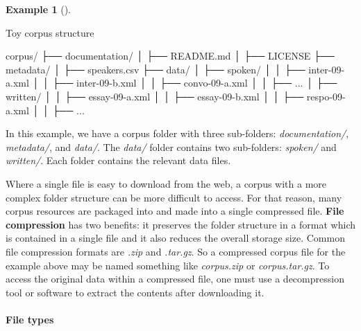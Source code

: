 \documentclass[
  letterpaper,
  DIV=11,
  numbers=noendperiod]{scrreport}
\let\oldparagraph\paragraph
\renewcommand{\paragraph}[1]{\oldparagraph{#1}\mbox{}}
\newenvironment{Shaded}{\begin{snugshade}}{\end{snugshade}}
\newcommand{\ExtensionTok}[1]{\textcolor[rgb]{0.00,0.00,0.00}{#1}}
\newcommand{\NormalTok}[1]{\textcolor[rgb]{0.00,0.00,0.00}{#1}}
\theoremstyle{definition}
\newtheorem{example}{Example}[chapter]
\theoremstyle{remark}
\begin{document}
\begin{example}[]\protect\hypertarget{exm-toy-corpus}{}\label{exm-toy-corpus}

Toy corpus structure

\begin{Shaded}
\begin{Highlighting}[]
\ExtensionTok{corpus/}
\ExtensionTok{├──}\NormalTok{ documentation/}
\ExtensionTok{│}\NormalTok{   ├── README.md}
\ExtensionTok{│}\NormalTok{   ├── LICENSE}
\ExtensionTok{├──}\NormalTok{ metadata/}
\ExtensionTok{│}\NormalTok{   ├── speakers.csv}
\ExtensionTok{├──}\NormalTok{ data/}
\ExtensionTok{│}\NormalTok{   ├── spoken/}
\ExtensionTok{│}\NormalTok{   │   ├── inter{-}09{-}a.xml}
\ExtensionTok{│}\NormalTok{   │   ├── inter{-}09{-}b.xml}
\ExtensionTok{│}\NormalTok{   │   ├── convo{-}09{-}a.xml}
\ExtensionTok{│}\NormalTok{   │   ├── ...}
\ExtensionTok{│}\NormalTok{   ├── written/}
\ExtensionTok{│}\NormalTok{   │   ├── essay{-}09{-}a.xml}
\ExtensionTok{│}\NormalTok{   │   ├── essay{-}09{-}b.xml}
\ExtensionTok{│}\NormalTok{   │   ├── respo{-}09{-}a.xml}
\ExtensionTok{│}\NormalTok{   │   ├── ...}
\end{Highlighting}
\end{Shaded}

\end{example}

In this example, we have a corpus folder with three sub-folders:
\emph{documentation/}, \emph{metadata/}, and \emph{data/}. The
\emph{data/} folder contains two sub-folders: \emph{spoken/} and
\emph{written/}. Each folder contains the relevant data files.

Where a single file is easy to download from the web, a corpus with a
more complex folder structure can be more difficult to access. For that
reason, many corpus resources are packaged into and made into a single
compressed file. \textbf{File compression} has two benefits: it
preserves the folder structure in a format which is contained in a
single file and it also reduces the overall storage size. Common file
compression formats are \emph{.zip} and \emph{.tar.gz}. So a compressed
corpus file for the example above may be named something like
\emph{corpus.zip} or \emph{corpus.tar.gz}. To access the original data
within a compressed file, one must use a decompression tool or software
to extract the contents after downloading it.

\hypertarget{file-types}{%
\paragraph{File types}\label{file-types}}
\end{document}
